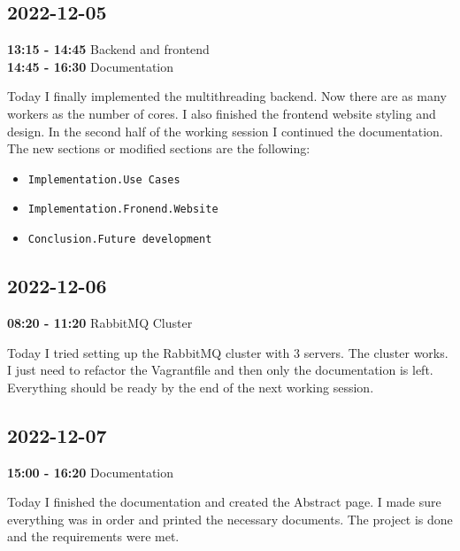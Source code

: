 \documentclass{article}
\begin{document}
\subsection{2022-12-05}

\textbf{13:15 - 14:45} Backend and frontend \\
\textbf{14:45 - 16:30} Documentation

Today I finally implemented the multithreading backend.
Now there are as many workers as the number of cores.
I also finished the frontend website styling and design.
In the second half of the working session I continued the documentation.
The new sections or modified sections are the following:
\begin{itemize}
    \item \texttt{Implementation.Use Cases}
    \item \texttt{Implementation.Fronend.Website}
    \item \texttt{Conclusion.Future development}
\end{itemize}

\subsection{2022-12-06}

\textbf{08:20 - 11:20} RabbitMQ Cluster

Today I tried setting up the RabbitMQ cluster with 3 servers.
The cluster works. I just need to refactor the Vagrantfile
and then only the documentation is left.
Everything should be ready by the end of the next working session.

\subsection{2022-12-07}

\textbf{15:00 - 16:20} Documentation

Today I finished the documentation and created the Abstract page.
I made sure everything was in order and printed the necessary documents.
The project is done and the requirements were met.
\end{document}
